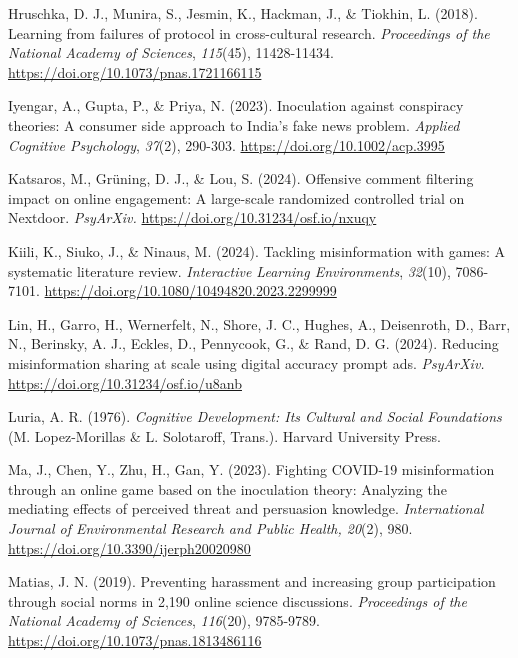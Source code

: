 \documentclass[authordate, reflection, issue]{jote-new-article}
\begin{document}
	Hruschka, D. J., Munira, S., Jesmin, K., Hackman, J., \& Tiokhin, L. (2018). Learning from failures of protocol in cross-cultural research. \emph{Proceedings of the National Academy of Sciences}, \emph{115}(45), 11428-11434. \url{https://doi.org/10.1073/pnas.1721166115}



	Iyengar, A., Gupta, P., \& Priya, N. (2023). Inoculation against conspiracy theories: A consumer side approach to India's fake news problem. \emph{Applied Cognitive Psychology}, \emph{37}(2), 290-303. \url{https://doi.org/10.1002/acp.3995}



	Katsaros, M., Grüning, D. J., \& Lou, S. (2024). Offensive comment filtering impact on online engagement: A large-scale randomized controlled trial on Nextdoor. \emph{PsyArXiv.} \url{https://doi.org/10.31234/osf.io/nxuqy}



	Kiili, K., Siuko, J., \& Ninaus, M. (2024). Tackling misinformation with games: A systematic literature review. \emph{Interactive Learning Environments}, \emph{32}(10), 7086-7101. \url{https://doi.org/10.1080/10494820.2023.2299999}



	Lin, H., Garro, H., Wernerfelt, N., Shore, J. C., Hughes, A., Deisenroth, D., Barr, N., Berinsky, A. J., Eckles, D., Pennycook, G., \& Rand, D. G. (2024). Reducing misinformation sharing at scale using digital accuracy prompt ads. \emph{PsyArXiv.} \url{https://doi.org/10.31234/osf.io/u8anb}



	Luria, A. R. (1976). \emph{Cognitive Development: Its Cultural and Social Foundations }(M. Lopez-Morillas \& L. Solotaroff, Trans.). Harvard University Press.



	Ma, J., Chen, Y., Zhu, H., Gan, Y. (2023). Fighting COVID-19 misinformation through an online game based on the inoculation theory: Analyzing the mediating effects of perceived threat and persuasion knowledge. \emph{International Journal of Environmental Research and Public Health, 20}(2), 980. \url{https://doi.org/10.3390/ijerph20020980}



	Matias, J. N. (2019). Preventing harassment and increasing group participation through social norms in 2,190 online science discussions. \emph{Proceedings of the National Academy of Sciences}, \emph{116}(20), 9785-9789. \url{https://doi.org/10.1073/pnas.1813486116}
\end{document}
